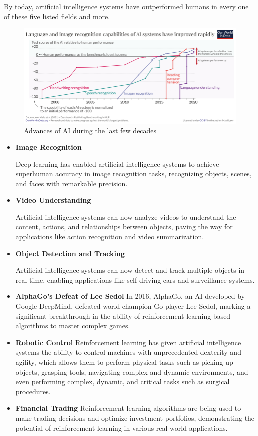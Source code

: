 \documentclass[masterthesis]{fer}
\begin{document}
By today, artificial intelligence systems have outperformed humans in every one of these five listed fields and more.
\cite{owid-brief-history-of-ai}
\begin{figure}[htb]
  \centering
  \includegraphics[width=1\linewidth]{Figures/AI performance history.png} 
  \caption{Advances of AI during the last few decades}
  \label{slk:AI_advances}
\end{figure}
\begin{itemize}
    \item \textbf{Image Recognition}
    
    Deep learning has enabled artificial intelligence systems
    to achieve superhuman accuracy in image recognition tasks,
    recognizing objects, scenes, and faces with remarkable precision.

    \item \textbf{Video Understanding}
    
    Artificial intelligence systems can now
    analyze videos to understand the content, actions, and relationships between objects,
    paving the way for applications like action recognition and video summarization.

    \item \textbf{Object Detection and Tracking}
    
    Artificial intelligence systems can now
    detect and track multiple objects in real time,
    enabling applications like self-driving cars and surveillance systems.
    \item \textbf{AlphaGo's Defeat of Lee Sedol} In 2016, AlphaGo, an AI developed by Google DeepMind, defeated world champion Go player Lee Sedol, marking a significant breakthrough in the ability of reinforcement-learning-based algorithms to master complex games.
    \item \textbf{Robotic Control} Reinforcement learning has given artificial intelligence systems the ability to control machines with unprecedented dexterity and agility, which allows them to perform physical tasks such as picking up objects, grasping tools, navigating complex and dynamic environments, and even performing complex, dynamic, and critical tasks such as surgical procedures.
    \cite{saeidi_opfermann_kam_wei_leonard_hsieh_kang_krieger_2022}
    \item \textbf{Financial Trading} Reinforcement learning algorithms are being used to make trading decisions and optimize investment portfolios, demonstrating the potential of reinforcement learning in various real-world applications.
\end{itemize}
\end{document}
